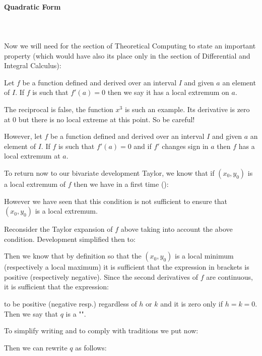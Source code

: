	\paragraph{Quadratic Form}\mbox{}\\\\
	Now we will need for the section of Theoretical Computing to state an important property (which would have also its place only in the section of Differential and Integral Calculus):
	
	Let $f$ be a function defined and derived over an interval $I$ and given $a$ an element of $I$. If $f$ is such that $f'(a)=0$ then we say it has a local extremum on $a$.
	
	\begin{tcolorbox}[title=Remarks,colframe=black,arc=10pt]
	The reciprocal is false, the function $x^3$ is such an example. Its derivative is zero at $0$ but there is no local extreme at this point. So be careful!
	\end{tcolorbox}
	
	However, let $f$ be a function defined and derived over an interval $I$ and given $a$ an element of $I$. If $f$ is such that $f'(a)=0$ and if $f'$ changes sign in $a$ then $f$ has a local extremum at $a$.
	
	To return now to our bivariate development Taylor, we know that if $(x_0,y_0)$ is a local extremum of $f$ then we have in a first time ():
	
	However we have seen that this condition is not sufficient to ensure that $(x_0,y_0)$ is a local extremum.
	
	Reconsider the Taylor expansion of $f$ above taking into account the above condition. Development simplified then to:
	
	Then we know that by definition so that the $(x_0,y_0)$ is a local minimum (respectively a local maximum) it is sufficient that the expression in brackets is positive (respectively negative). Since the second derivatives of $f$ are continuous, it is sufficient that the expression:
	
	to be positive (negative resp.) regardless of $h$ or $k$ and it is zero only if $h=k=0$. Then we say that $q$ is a "".
	
	To simplify writing and to comply with traditions we put now:
	
	Then we can rewrite $q$ as follows:
	
